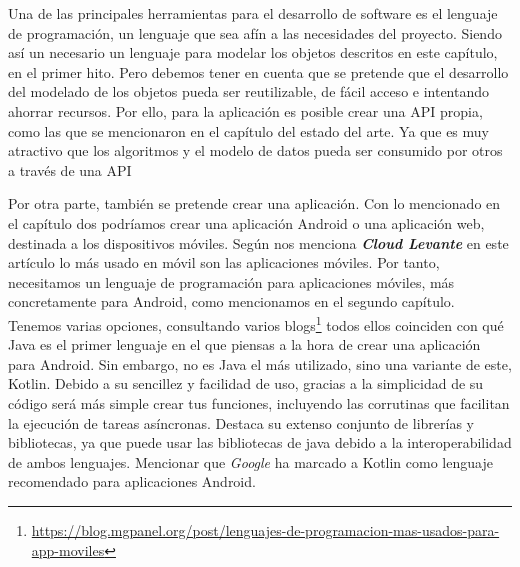 Una de las principales herramientas para el desarrollo de software es el lenguaje de programación, un 
lenguaje que sea afín a las necesidades del proyecto. Siendo así un necesario un lenguaje para modelar 
los objetos descritos en este capítulo, en el primer hito. Pero debemos tener en cuenta que se pretende 
que el desarrollo del modelado de los objetos pueda ser reutilizable, de fácil acceso e intentando 
ahorrar recursos. Por ello, para la aplicación es posible crear una API propia, como las que se 
mencionaron en el capítulo del estado del arte. Ya que es muy atractivo que los algoritmos y el modelo 
de datos pueda ser consumido por otros a través de una API

Por otra parte, también se pretende crear una aplicación. Con lo mencionado en el capítulo dos 
podríamos crear una aplicación Android o una aplicación web, destinada a los 
dispositivos móviles. Según nos menciona \textbf{\textit{Cloud Levante}} en este artículo 
\cite{WebVSApp} lo más usado en móvil son las aplicaciones móviles. Por 
tanto, necesitamos un lenguaje de programación para aplicaciones móviles, más concretamente para 
Android, como mencionamos en el segundo capítulo. Tenemos varias opciones, consultando varios 
blogs\footnote{\url{https://blog.mgpanel.org/post/lenguajes-de-programacion-mas-usados-para-app-moviles}} todos ellos coinciden con qué Java es el primer lenguaje en el que piensas a la hora de crear 
una aplicación para Android. Sin embargo, no es Java el más utilizado, sino una variante de este, 
Kotlin. Debido a su sencillez y facilidad de uso, gracias a la simplicidad de su código será más simple 
crear tus funciones, incluyendo las corrutinas que facilitan la ejecución de tareas asíncronas. Destaca 
su extenso conjunto de librerías y bibliotecas, ya que puede usar las bibliotecas de java debido a la 
interoperabilidad de ambos lenguajes. Mencionar que \textit{Google} ha marcado a Kotlin como lenguaje 
recomendado para aplicaciones Android.

